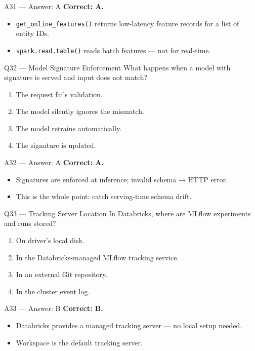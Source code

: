 \documentclass[aspectratio=169,10pt]{beamer}
\begin{document}
	\begin{frame}{A31 — Answer: A}
		\textbf{Correct: A.}
		\begin{itemize}
			\item \texttt{get\_online\_features()} returns low-latency feature records for a list of entity IDs.
			\item \texttt{spark.read.table()} reads batch features — not for real-time.
		\end{itemize}
	\end{frame}
	
	\begin{frame}{Q32 — Model Signature Enforcement}
		What happens when a model with signature is served and input does not match?
		\begin{enumerate}[label=\Alph*.]
			\item The request fails validation.
			\item The model silently ignores the mismatch.
			\item The model retrains automatically.
			\item The signature is updated.
		\end{enumerate}
	\end{frame}
	
	\begin{frame}{A32 — Answer: A}
		\textbf{Correct: A.}
		\begin{itemize}
			\item Signatures are enforced at inference; invalid schema → HTTP error.
			\item This is the whole point: catch serving-time schema drift.
		\end{itemize}
	\end{frame}
	
	\begin{frame}{Q33 — Tracking Server Location}
		In Databricks, where are MLflow experiments and runs stored?
		\begin{enumerate}[label=\Alph*.]
			\item On driver's local disk.
			\item In the Databricks-managed MLflow tracking service.
			\item In an external Git repository.
			\item In the cluster event log.
		\end{enumerate}
	\end{frame}
	
	\begin{frame}{A33 — Answer: B}
		\textbf{Correct: B.}
		\begin{itemize}
			\item Databricks provides a managed tracking server — no local setup needed.
			\item Workspace is the default tracking server.
		\end{itemize}
	\end{frame}
	
\end{document}
